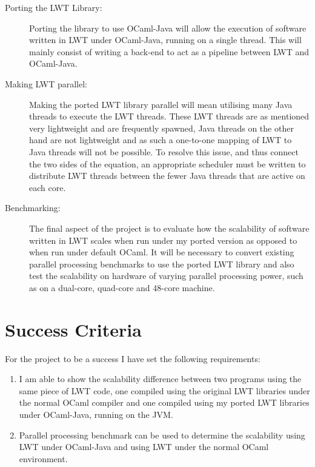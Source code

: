 \begin{description}
\item[Porting the LWT Library:] Porting the library to use OCaml-Java will allow the execution of software written in LWT under OCaml-Java, running on a single thread. This will mainly consist of writing a back-end to act as a pipeline between LWT and OCaml-Java. 

\item[Making LWT parallel:] Making the ported LWT library parallel will mean utilising many Java threads to execute the LWT threads. These LWT threads are as mentioned very lightweight and are frequently spawned, Java threads on the other hand are not lightweight and as such a one-to-one mapping of LWT to Java threads will not be possible. To resolve this issue, and thus connect the two sides of the equation, an appropriate scheduler must be written to distribute LWT threads between the fewer Java threads that are active on each core.

\item[Benchmarking:] The final aspect of the project is to evaluate how the scalability of software written in LWT scales when run under my ported version as opposed to when run under default OCaml. It will be necessary to convert existing parallel processing benchmarks to use the ported LWT library and also test the scalability on hardware of varying parallel processing power, such as on a dual-core, quad-core and 48-core machine.
\end{description}

\section{Success Criteria}
\label{sec:success}
For the project to be a success I have set the following requirements:
\begin{enumerate}

\item{I am able to show the scalability difference between two programs using the same piece of LWT code, one compiled using the original LWT libraries under the normal OCaml compiler and one compiled using my ported LWT libraries under OCaml-Java, running on the JVM.}
\item{Parallel processing benchmark can be used to determine the scalability using LWT under OCaml-Java and using LWT under the normal OCaml environment.}
\end{enumerate}

